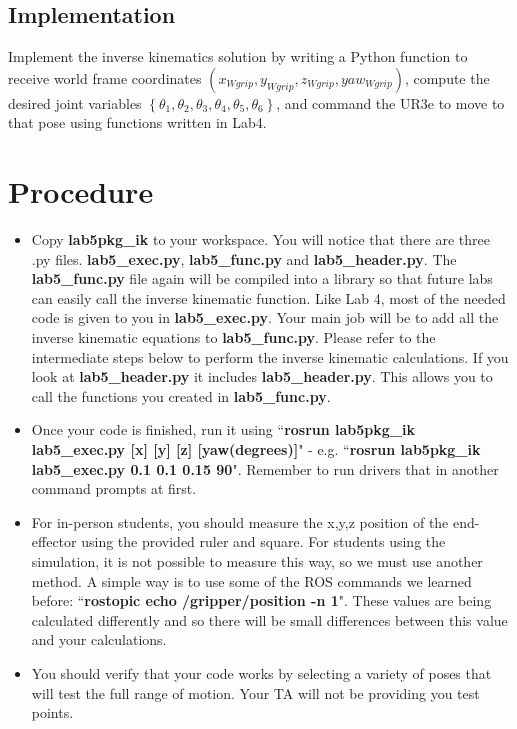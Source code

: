 \subsection{Implementation}
Implement the inverse kinematics solution by writing a Python function to receive world frame coordinates $(x_{Wgrip},y_{Wgrip},z_{Wgrip},yaw_{Wgrip})$, compute the desired
joint variables $\left\{\theta_1,\theta_2,\theta_3,\theta_4,\theta_5,\theta_6\right\}$, and command the UR3e to move to that pose
using functions written in Lab4.

\section{Procedure}
\begin{itemize}
	\item Copy \textbf{lab5pkg\_ik} to your workspace.  You will notice that there are three .py files.  
\textbf{lab5\_exec.py}, \textbf{lab5\_func.py} and \textbf{lab5\_header.py}.  The \textbf{lab5\_func.py} file again will be compiled into a library so that future labs can easily call the inverse kinematic
function.  Like Lab 4, most of the needed code is given to you in \textbf{lab5\_exec.py}.  Your main job will be to add all the inverse kinematic equations to
\textbf{lab5\_func.py}. Please refer to the intermediate steps below to perform the inverse kinematic calculations.  If you look
at \textbf{lab5\_header.py} it includes \textbf{lab5\_header.py}.  This allows you to call the functions you created in \textbf{lab5\_func.py}.

    \item Once your code is finished, run it using ``\textbf{rosrun lab5pkg\_ik lab5\_exec.py [x] [y] [z] [yaw(degrees)]}" - e.g. ``\textbf{rosrun lab5pkg\_ik lab5\_exec.py 0.1 0.1 0.15 90}".  Remember to run drivers that in another command prompts at first. 

    \item For in-person students, you should measure the x,y,z position of the end-effector using the provided ruler and square.  For students using the simulation, it is not possible to measure this way, so we must use another method.  A simple way is to use some of the ROS commands we learned before: ``\textbf{rostopic echo /gripper/position -n 1}".  These values are being calculated differently and so there will be small differences between this value and your calculations.
    
    \item You should verify that your code works by selecting a variety of poses that will test the full range of motion.  Your TA will not be providing you test points.


\end{itemize}
